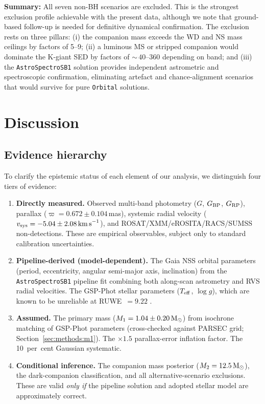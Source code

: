 \documentclass[usenatbib,fleqn]{mnras}
\newcommand{\Msun}{{\rm M}_\odot}
\newcommand{\kms}{{\rm km\,s}^{-1}}
\begin{document}
\medskip\noindent
\textbf{Summary:} All seven non-BH scenarios are excluded.  This
is the strongest exclusion profile achievable with the present
data, although we note that ground-based follow-up is needed
for definitive dynamical confirmation.  The
exclusion rests on three pillars:
(i) the companion mass exceeds the WD and NS mass ceilings by
factors of 5--9; (ii) a luminous MS or stripped companion would
dominate the K-giant SED by factors of $\sim$\,$40$--$360$
depending on band; and (iii) the
\texttt{AstroSpectroSB1} solution provides independent
astrometric and spectroscopic confirmation, eliminating
artefact and chance-alignment scenarios that would survive for
pure \texttt{Orbital} solutions.

\section{Discussion}
\label{sec:discussion}

\subsection{Evidence hierarchy}
\label{sec:evidence_hierarchy}

To clarify the epistemic status of each element of our analysis,
we distinguish four tiers of evidence:

\begin{enumerate}
\item \textbf{Directly measured.}  Observed multi-band photometry
  ($G$, $G_{\rm BP}$, $G_{\rm RP}$),
  parallax ($\varpi = 0.672 \pm 0.104$\,mas), systemic radial
  velocity ($v_{\rm sys} = -5.04 \pm 2.08\,\kms$), and
  ROSAT/XMM/eROSITA/RACS/SUMSS non-detections.  These are empirical
  observables, subject only to standard calibration uncertainties.

\item \textbf{Pipeline-derived (model-dependent).}  The Gaia NSS
  orbital parameters (period, eccentricity, angular semi-major
  axis, inclination) from the \texttt{AstroSpectroSB1} pipeline
  fit combining both along-scan astrometry and RVS radial velocities.
  The GSP-Phot stellar parameters
  ($T_{\rm eff}$, $\log g$), which are known to be unreliable at
  RUWE~$= 9.22$ \citep{Andrae2023}.

\item \textbf{Assumed.}  The primary mass
  ($M_1 = 1.04 \pm 0.20\,\Msun$) from isochrone matching of
  GSP-Phot parameters (cross-checked against PARSEC grid;
  Section~\ref{sec:methods:m1}).  The $\times 1.5$ parallax-error
  inflation factor.  The 10~per~cent Gaussian systematic.

\item \textbf{Conditional inference.}  The companion mass
  posterior ($M_2 = 12.5\,\Msun$), the dark-companion
  classification, and all alternative-scenario exclusions.  These
  are valid \emph{only if} the pipeline solution and adopted
  stellar model are approximately correct.
\end{enumerate}
\end{document}
